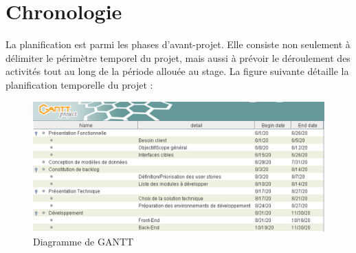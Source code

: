 \section{	Chronologie}
\hspace{4mm}La planification est parmi les phases d'avant-projet. Elle consiste non seulement à délimiter le périmètre temporel du projet, mais aussi à prévoir le déroulement des activités tout au long de la période allouée au stage. La figure suivante détaille la planification temporelle du projet :
    

\begin{figure}[h]
		\centering
		\includegraphics[scale=0.9]{figures/anis3.png}
		\caption{Diagramme de GANTT}
		\label{fig:gantt}
\end{figure}
